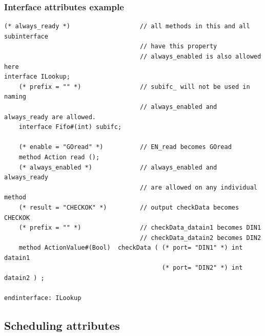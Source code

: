 \documentclass[twoside,letterpaper]{article}
\begin{document}

\subsubsection{Interface attributes example}
\label{sec-int-att-example}

\begin{verbatim}
(* always_ready *)                   // all methods in this and all subinterface 
                                     // have this property
                                     // always_enabled is also allowed here  
interface ILookup;                      
    (* prefix = "" *)                // subifc_ will not be used in naming
                                     // always_enabled and always_ready are allowed.
    interface Fifo#(int) subifc;        

    (* enable = "GOread" *)          // EN_read becomes GOread
    method Action read ();
    (* always_enabled *)             // always_enabled and always_ready                            
                                     // are allowed on any individual method  
    (* result = "CHECKOK" *)         // output checkData becomes CHECKOK
    (* prefix = "" *)                // checkData_datain1 becomes DIN1
                                     // checkData_datain2 becomes DIN2
    method ActionValue#(Bool)  checkData ( (* port= "DIN1" *) int datain1
                                           (* port= "DIN2" *) int datain2 ) ;

endinterface: ILookup
\end{verbatim}


\subsection{Scheduling attributes}

\label{sec-rule-attributes}

\end{document}
